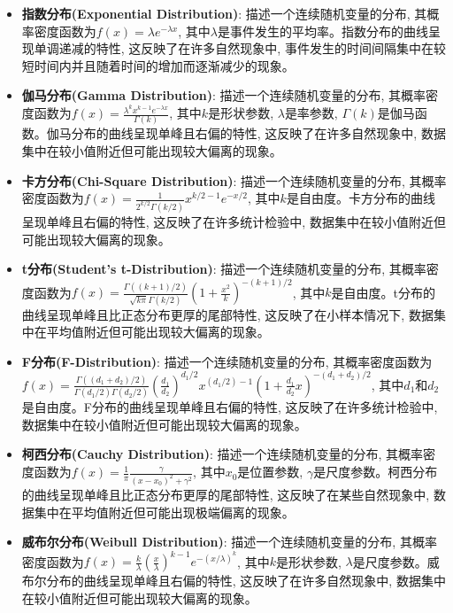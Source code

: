 \documentclass[12pt, a4paper, UTF8]{ctexart}
\newcommand{\term}[1]{\textbf{\textcolor{blue!80!black}{#1}}}
\begin{document}
\begin{sloppypar}
\begin{itemize}[nosep]
        \item \term{指数分布(Exponential Distribution)}: 描述一个连续随机变量的分布, 其概率密度函数为$f(x) = \lambda e^{-\lambda x}$, 其中$\lambda$是事件发生的平均率。指数分布的曲线呈现单调递减的特性, 这反映了在许多自然现象中, 事件发生的时间间隔集中在较短时间内并且随着时间的增加而逐渐减少的现象。
        \item \term{伽马分布(Gamma Distribution)}: 描述一个连续随机变量的分布, 其概率密度函数为$f(x) = \frac{\lambda^k x^{k-1} e^{-\lambda x}}{\Gamma(k)}$, 其中$k$是形状参数, $\lambda$是率参数, $\Gamma(k)$是伽马函数。伽马分布的曲线呈现单峰且右偏的特性, 这反映了在许多自然现象中, 数据集中在较小值附近但可能出现较大偏离的现象。
        \item \term{卡方分布(Chi-Square Distribution)}: 描述一个连续随机变量的分布, 其概率密度函数为$f(x) = \frac{1}{2^{k/2} \Gamma(k/2)} x^{k/2 - 1} e^{-x/2}$, 其中$k$是自由度。卡方分布的曲线呈现单峰且右偏的特性, 这反映了在许多统计检验中, 数据集中在较小值附近但可能出现较大偏离的现象。
        \item \term{t分布(Student's t-Distribution)}: 描述一个连续随机变量的分布, 其概率密度函数为$f(x) = \frac{\Gamma((k+1)/2)}{\sqrt{k\pi} \Gamma(k/2)} \left(1 + \frac{x^2}{k}\right)^{-(k+1)/2}$, 其中$k$是自由度。t分布的曲线呈现单峰且比正态分布更厚的尾部特性, 这反映了在小样本情况下, 数据集中在平均值附近但可能出现较大偏离的现象。
        \item \term{F分布(F-Distribution)}: 描述一个连续随机变量的分布, 其概率密度函数为$f(x) = \frac{\Gamma((d_1 + d_2)/2)}{\Gamma(d_1/2) \Gamma(d_2/2)} \left(\frac{d_1}{d_2}\right)^{d_1/2} x^{(d_1/2) - 1} \left(1 + \frac{d_1}{d_2} x\right)^{-(d_1 + d_2)/2}$, 其中$d_1$和$d_2$是自由度。F分布的曲线呈现单峰且右偏的特性, 这反映了在许多统计检验中, 数据集中在较小值附近但可能出现较大偏离的现象。
        \item \term{柯西分布(Cauchy Distribution)}: 描述一个连续随机变量的分布, 其概率密度函数为$f(x) = \frac{1}{\pi} \frac{\gamma}{(x - x_0)^2 + \gamma^2}$, 其中$x_0$是位置参数, $\gamma$是尺度参数。柯西分布的曲线呈现单峰且比正态分布更厚的尾部特性, 这反映了在某些自然现象中, 数据集中在平均值附近但可能出现极端偏离的现象。
        \item \term{威布尔分布(Weibull Distribution)}: 描述一个连续随机变量的分布, 其概率密度函数为$f(x) = \frac{k}{\lambda} \left(\frac{x}{\lambda}\right)^{k-1} e^{-(x/\lambda)^k}$, 其中$k$是形状参数, $\lambda$是尺度参数。威布尔分布的曲线呈现单峰且右偏的特性, 这反映了在许多自然现象中, 数据集中在较小值附近但可能出现较大偏离的现象。
    \end{itemize}

\end{sloppypar}
\end{document}
